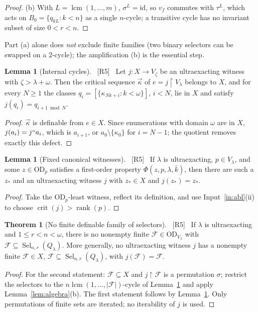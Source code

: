 \documentclass[11pt,letterpaper]{article}
\theoremstyle{definition}
\newtheorem{theorem}[definition]{Theorem}
\newtheorem{lemma}[definition]{Lemma}
\numberwithin{equation}{section}
\newcommand{\OD}{\mathrm{OD}}
\newcommand{\crit}{\operatorname{crit}}
\newcommand{\rank}{\operatorname{rank}}
\newcommand{\lcm}{\operatorname{lcm}}
\newcommand{\id}{\mathrm{id}}
\newcommand{\restr}{\mathbin{\upharpoonright}}
\newcommand{\Sel}{\operatorname{Sel}}
\newcommand{\FF}{\mathcal F}
\newcommand{\src}[1]{\unskip\ {\normalfont\small\sffamily\color{Olive}[#1]}\ }
\begin{document}
\begin{proof}
(b) With $L=\lcm(1,\dots,m)$, $\sigma^L=\id$, so $v_f$ commutes with $\tau^L$, which acts on $B_0=\{q_{kL}:k<n\}$ as a single $n$-cycle; a transitive cycle has no invariant subset of size $0<r<n$.
\end{proof}

Part (a) alone does \emph{not} exclude finite families (two binary selectors can be swapped on a 2-cycle); the amplification (b) is the essential step.

\begin{lemma}[Internal cycles]\label{lem:cycles}\src{R5}
Let $j:X\to V_\zeta$ be an ultraexacting witness with $\zeta>\lambda+\omega$. Then the critical sequence $\vec\kappa$ of $e=j\restr V_\lambda$ belongs to $X$, and for every $N\ge1$ the classes $q_i=[\{\kappa_{Nk+i}:k<\omega\}]$, $i<N$, lie in $X$ and satisfy $j(q_i)=q_{i+1\bmod N}$.
\end{lemma}

\begin{proof}
$\vec\kappa$ is definable from $e\in X$. Since enumerations with domain $\omega$ are in $X$, $j(a_i)=j``a_i$, which is $a_{i+1}$, or $a_0\setminus\{\kappa_0\}$ for $i=N-1$; the quotient removes exactly this defect.
\end{proof}

\begin{lemma}[Fixed canonical witnesses]\label{lem:canonical}\src{R5}
If $\lambda$ is ultraexacting, $p\in V_\lambda$, and some $z\in\OD_p$ satisfies a first-order property $\Phi(z,p,\lambda,\bar k)$, then there are such a $z_*$ and an ultraexacting witness $j$ with $z_*\in X$ and $j(z_*)=z_*$.
\end{lemma}

\begin{proof}
Take the $\OD_p$-least witness, reflect its definition, and use Input~\ref{in:abl}(ii) to choose $\crit(j)>\rank(p)$.
\end{proof}

\begin{theorem}[No finite definable family of selectors]\label{thm:fsel}\src{R5}
If $\lambda$ is ultraexacting and $1\le r<n<\omega$, there is no nonempty finite $\FF\in\OD_{V_\lambda}$ with $\FF\subseteq\Sel_{n,r}(Q_\lambda)$. More generally, no ultraexacting witness $j$ has a nonempty finite $\FF\in X$, $\FF\subseteq\Sel_{n,r}(Q_\lambda)$, with $j(\FF)=\FF$.
\end{theorem}

\begin{proof}
For the second statement: $\FF\subseteq X$ and $j\restr\FF$ is a permutation $\sigma$; restrict the selectors to the $n\lcm(1,\dots,|\FF|)$-cycle of Lemma~\ref{lem:cycles} and apply Lemma~\ref{lem:algebra}(b). The first statement follows by Lemma~\ref{lem:canonical}. Only permutations of finite sets are iterated; no iterability of $j$ is used.
\end{proof}
\end{document}
